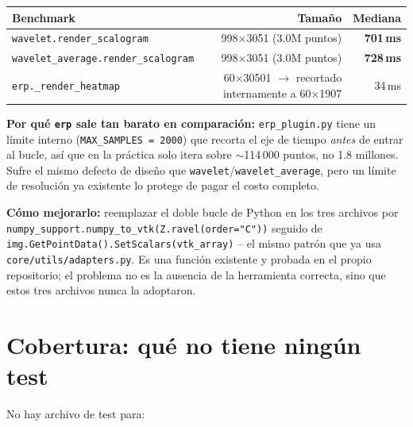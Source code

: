 \documentclass[11pt,a4paper]{article}
\begin{document}
\begin{center}
\begin{tabular}{lrr}
\toprule
\textbf{Benchmark} & \textbf{Tamaño} & \textbf{Mediana} \\
\midrule
\texttt{wavelet.render\_\allowbreak scalogram} & 998$\times$3051 (3.0M puntos) & \textbf{701\,ms} \\
\texttt{wavelet\_\allowbreak average.render\_\allowbreak scalogram} & 998$\times$3051 (3.0M puntos) & \textbf{728\,ms} \\
\texttt{erp.\_\allowbreak render\_\allowbreak heatmap} & 60$\times$30501 $\to$ recortado internamente a 60$\times$1907 & 34\,ms \\
\bottomrule
\end{tabular}
\end{center}

\textbf{Por qué \texttt{erp} sale tan barato en comparación:} \texttt{erp\_\allowbreak plugin.py} tiene un límite interno
(\texttt{MAX\_\allowbreak SAMPLES = 2000}) que recorta el eje de tiempo \emph{antes} de entrar al bucle, así que en la
práctica solo itera sobre $\sim$114\,000 puntos, no 1.8 millones. Sufre el mismo defecto de diseño que
\texttt{wavelet}/\texttt{wavelet\_\allowbreak average}, pero un límite de resolución ya existente lo protege de pagar el
costo completo.

\textbf{Cómo mejorarlo:} reemplazar el doble bucle de Python en los tres archivos por
\texttt{numpy\_\allowbreak support.numpy\_\allowbreak to\_\allowbreak vtk(Z.ravel(order="C"))} seguido de
\texttt{img.GetPointData().SetScalars(vtk\_\allowbreak array)} -- el mismo patrón que ya usa
\texttt{core/utils/adapters.py}. Es una función existente y probada en el propio repositorio; el problema no
es la ausencia de la herramienta correcta, sino que estos tres archivos nunca la adoptaron.

\newpage
\section{Cobertura: qué no tiene ningún test}
\label{sec:cobertura}

No hay archivo de test para:
\end{document}
